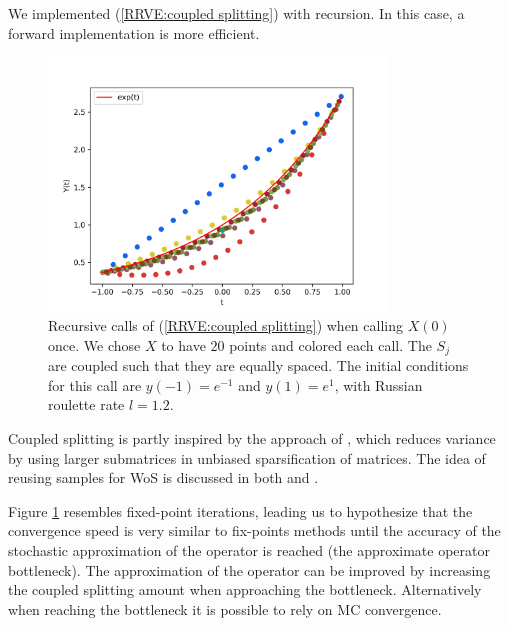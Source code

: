 \documentclass[a4paper,12pt]{article}
\begin{document}
\begin{pythonn} \label{py:coupled splitting}
    We implemented (\ref{RRVE:coupled splitting}) with recursion. In this case,
    a forward implementation is more efficient. \\

    \begin{figure}[h!]
        \centering
        \includegraphics[width=0.8\textwidth]{plots/coupled split.png}
        \caption{Recursive calls of (\ref{RRVE:coupled splitting}) when
        calling $X(0)$ once. We chose $X$ to have $20$ points and
        colored each call. The $S_{j}$ are coupled such that
        they are equally spaced.
        The initial conditions for this call are $y(-1)=e^{-1}$ and $y(1)=e^{1}$,
        with Russian roulette rate $l=1.2$. }
        \label{fig:coupled splitting}
    \end{figure}
\end{pythonn}

\begin{related}
    Coupled splitting is partly inspired by the approach
    of \cite{sabelfeld_sparsified_2009}, which reduces
    variance by using larger submatrices in unbiased sparsification
    of matrices. The idea
    of reusing samples for WoS is discussed in both
    \cite{miller_boundary_2023} and \cite{bakbouk_mean_2023}.
\end{related}

Figure \ref{fig:coupled splitting}
resembles fixed-point iterations, leading us to hypothesize
that the convergence
speed is very similar to fix-points methods until the accuracy
of the stochastic approximation of the operator is reached
(the approximate operator bottleneck). The approximation of the operator
can be improved by increasing the coupled splitting amount when
approaching the bottleneck. Alternatively when reaching
the bottleneck it is possible to rely on MC convergence.
\end{document}
